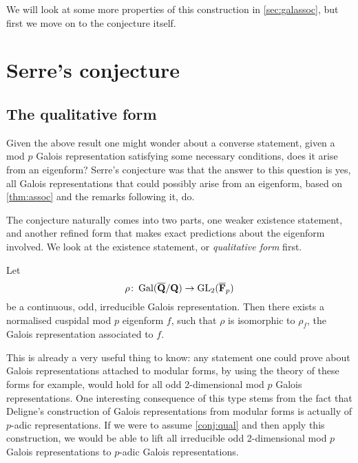 \documentclass[a4paper,12pt]{article}
\begin{document}
We will look at some more properties of this construction in \cref{sec:galassoc}, but first we move on to the conjecture itself.


\section{Serre's conjecture}
\subsection{The qualitative form}
Given the above result one might wonder about a converse statement, given a mod $p$ Galois representation satisfying some necessary conditions, does it arise from an eigenform?
Serre's conjecture was that the answer to this question is yes, all Galois representations that could possibly arise from an eigenform, based on \cref{thm:assoc} and the remarks following it, do.

The conjecture naturally comes into two parts, one weaker existence statement, and another refined form that makes exact predictions about the eigenform involved.
We look at the existence statement, or \emph{qualitative form} first.

\begin{conjecture}\label{conj:qual}
Let
\[
\rho\colon \operatorname{Gal}(\overline{\mathbf{Q}}/\mathbf{Q}) \to \operatorname{GL}_2(\overline{\mathbf{F}}_p)
\]
be a continuous, odd, irreducible Galois representation.
Then there exists a normalised cuspidal mod $p$ eigenform $f$, such that $\rho$ is isomorphic to $\rho_f$, the Galois representation associated to $f$.
\end{conjecture}

This is already a very useful thing to know: any statement one could prove about Galois representations attached to  modular forms, by using the theory of these forms for example, would hold for all odd 2-dimensional mod $p$ Galois representations. %
One interesting consequence of this type stems from the fact that Deligne's construction of Galois representations from modular forms is actually of $p$-adic representations.
If we were to assume \cref{conj:qual} and then apply this construction, we would be able to lift all irreducible odd 2-dimensional mod $p$ Galois representations to $p$-adic Galois representations.
\end{document}
